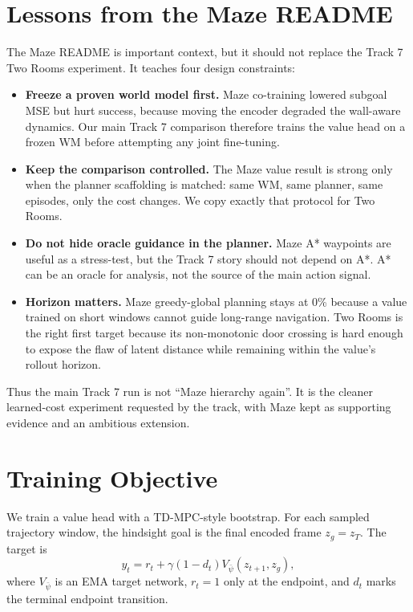 \documentclass[11pt]{article}
\begin{document}
\section{Lessons from the Maze README}

The Maze README is important context, but it should not replace the Track 7
Two Rooms experiment. It teaches four design constraints:

\begin{itemize}
  \item \textbf{Freeze a proven world model first.} Maze co-training lowered
  subgoal MSE but hurt success, because moving the encoder degraded the
  wall-aware dynamics. Our main Track 7 comparison therefore trains the value
  head on a frozen WM before attempting any joint fine-tuning.
  \item \textbf{Keep the comparison controlled.} The Maze value result is strong
  only when the planner scaffolding is matched: same WM, same planner, same
  episodes, only the cost changes. We copy exactly that protocol for Two Rooms.
  \item \textbf{Do not hide oracle guidance in the planner.} Maze A* waypoints
  are useful as a stress-test, but the Track 7 story should not depend on A*.
  A* can be an oracle for analysis, not the source of the main action signal.
  \item \textbf{Horizon matters.} Maze greedy-global planning stays at 0\%
  because a value trained on short windows cannot guide long-range navigation.
  Two Rooms is the right first target because its non-monotonic door crossing is
  hard enough to expose the flaw of latent distance while remaining within the
  value's rollout horizon.
\end{itemize}

Thus the main Track 7 run is not ``Maze hierarchy again''. It is the cleaner
learned-cost experiment requested by the track, with Maze kept as supporting
evidence and an ambitious extension.

\section{Training Objective}

We train a value head with a TD-MPC-style bootstrap. For each sampled trajectory
window, the hindsight goal is the final encoded frame \(z_g=z_T\). The target is
\[
  y_t = r_t + \gamma (1-d_t) V_{\bar\psi}(z_{t+1}, z_g),
\]
where \(V_{\bar\psi}\) is an EMA target network, \(r_t=1\) only at the endpoint,
and \(d_t\) marks the terminal endpoint transition.
\end{document}
